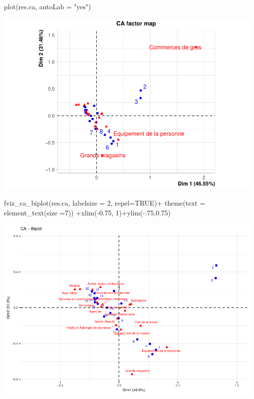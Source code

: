 \documentclass[
]{book}
\newenvironment{Shaded}{\begin{snugshade}}{\end{snugshade}}
\newcommand{\AttributeTok}[1]{\textcolor[rgb]{0.77,0.63,0.00}{#1}}
\newcommand{\ConstantTok}[1]{\textcolor[rgb]{0.00,0.00,0.00}{#1}}
\newcommand{\DecValTok}[1]{\textcolor[rgb]{0.00,0.00,0.81}{#1}}
\newcommand{\FloatTok}[1]{\textcolor[rgb]{0.00,0.00,0.81}{#1}}
\newcommand{\FunctionTok}[1]{\textcolor[rgb]{0.00,0.00,0.00}{#1}}
\newcommand{\NormalTok}[1]{#1}
\newcommand{\SpecialCharTok}[1]{\textcolor[rgb]{0.00,0.00,0.00}{#1}}
\newcommand{\StringTok}[1]{\textcolor[rgb]{0.31,0.60,0.02}{#1}}
\begin{document}
\begin{Shaded}
\begin{Highlighting}[]
\FunctionTok{plot}\NormalTok{(res.ca, }\AttributeTok{autoLab =} \StringTok{"yes"}\NormalTok{)}
\end{Highlighting}
\end{Shaded}

\includegraphics{bookdown-demo_files/figure-latex/0610-2.pdf}

\begin{Shaded}
\begin{Highlighting}[]
\FunctionTok{fviz\_ca\_biplot}\NormalTok{(res.ca, }\AttributeTok{labelsize =} \DecValTok{2}\NormalTok{, }\AttributeTok{repel=}\ConstantTok{TRUE}\NormalTok{)}\SpecialCharTok{+}
  \FunctionTok{theme}\NormalTok{(}\AttributeTok{text =} \FunctionTok{element\_text}\NormalTok{(}\AttributeTok{size =}\DecValTok{7}\NormalTok{)) }\SpecialCharTok{+}\FunctionTok{xlim}\NormalTok{(}\SpecialCharTok{{-}}\FloatTok{0.75}\NormalTok{, }\DecValTok{1}\NormalTok{)}\SpecialCharTok{+}\FunctionTok{ylim}\NormalTok{(}\SpecialCharTok{{-}}\NormalTok{.}\DecValTok{75}\NormalTok{,}\FloatTok{0.75}\NormalTok{)}
\end{Highlighting}
\end{Shaded}

\includegraphics{bookdown-demo_files/figure-latex/0610-3.pdf}
\end{document}
